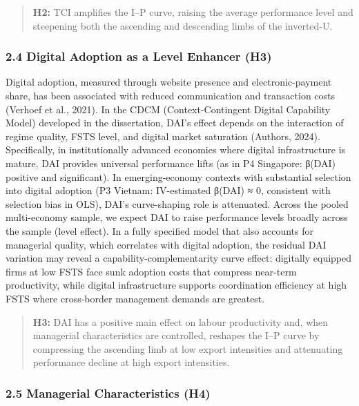 \documentclass[
  12pt,a4paper]{article}
\begin{document}
\begin{quote}
\textbf{H2:} TCI amplifies the I--P curve, raising the average
performance level and steepening both the ascending and descending limbs
of the inverted-U.
\end{quote}

\hypertarget{digital-adoption-as-a-level-enhancer-h3}{%
\subsubsection{2.4 Digital Adoption as a Level Enhancer
(H3)}\label{digital-adoption-as-a-level-enhancer-h3}}

Digital adoption, measured through website presence and
electronic-payment share, has been associated with reduced communication
and transaction costs (Verhoef et al., 2021). In the CDCM
(Context-Contingent Digital Capability Model) developed in the
dissertation, DAI's effect depends on the interaction of regime quality,
FSTS level, and digital market saturation (Authors, 2024). Specifically,
in institutionally advanced economies where digital infrastructure is
mature, DAI provides universal performance lifts (as in P4 Singapore:
β(DAI) positive and significant). In emerging-economy contexts with
substantial selection into digital adoption (P3 Vietnam: IV-estimated
β(DAI) ≈ 0, consistent with selection bias in OLS), DAI's curve-shaping
role is attenuated. Across the pooled multi-economy sample, we expect
DAI to raise performance levels broadly across the sample (level
effect). In a fully specified model that also accounts for managerial
quality, which correlates with digital adoption, the residual DAI
variation may reveal a capability-complementarity curve effect:
digitally equipped firms at low FSTS face sunk adoption costs that
compress near-term productivity, while digital infrastructure supports
coordination efficiency at high FSTS where cross-border management
demands are greatest.

\begin{quote}
\textbf{H3:} DAI has a positive main effect on labour productivity and,
when managerial characteristics are controlled, reshapes the I--P curve
by compressing the ascending limb at low export intensities and
attenuating performance decline at high export intensities.
\end{quote}

\hypertarget{managerial-characteristics-h4}{%
\subsubsection{2.5 Managerial Characteristics
(H4)}\label{managerial-characteristics-h4}}
\end{document}
